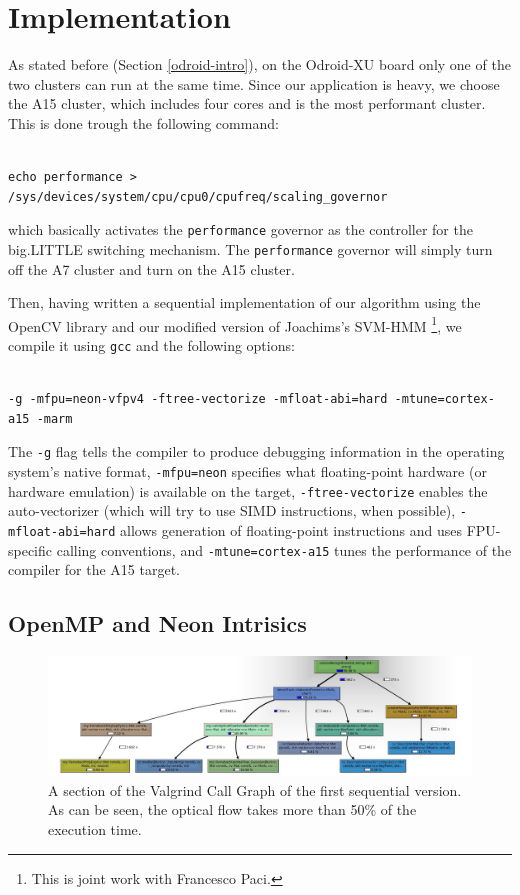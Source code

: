 \section{Implementation}
\lstset{language=C++}

As stated before (Section \ref{odroid-intro}), on the Odroid-XU board only one of the two clusters can run at the same time. Since our application is heavy, we choose the A15 cluster, which includes four cores and is the most performant cluster. This is done trough the following command:
\begin{lstlisting}[frame=single]  % Start your code-block

echo performance > /sys/devices/system/cpu/cpu0/cpufreq/scaling_governor
\end{lstlisting}
which basically activates the \verb+performance+ governor as the controller for the big.LITTLE switching mechanism. The \verb+performance+ governor will simply turn off the A7 cluster and turn on the A15 cluster.

Then, having written a sequential implementation of our algorithm using the OpenCV library and our modified version of Joachims's SVM-HMM \cite{joachims} \footnote{This is joint work with Francesco Paci.}, we compile it using \verb+gcc+ and the following options:
\begin{lstlisting}[frame=single]  % Start your code-block

-g -mfpu=neon-vfpv4 -ftree-vectorize -mfloat-abi=hard -mtune=cortex-a15 -marm
\end{lstlisting}

The \verb+-g+ flag tells the compiler to produce debugging information in the operating system's native format, \verb+-mfpu=neon+  specifies what floating-point hardware (or hardware emulation) is available on the target, \verb+-ftree-vectorize+ enables the auto-vectorizer (which will try to use SIMD instructions, when possible), \verb+-mfloat-abi=hard+ allows generation of floating-point instructions and uses FPU-specific calling conventions, and \verb+-mtune=cortex-a15+ tunes the performance of the compiler for the A15 target.

\subsection{OpenMP and Neon Intrisics}
\begin{figure}[t!]
\centering
\includegraphics[width=1.5\linewidth,angle=90]{Figures/grafico_prestazioni.jpg}
\caption{A section of the Valgrind Call Graph of the first sequential version. As can be seen, the optical flow takes more than 50\% of the execution time.}
\label{valgrind}
\end{figure}

